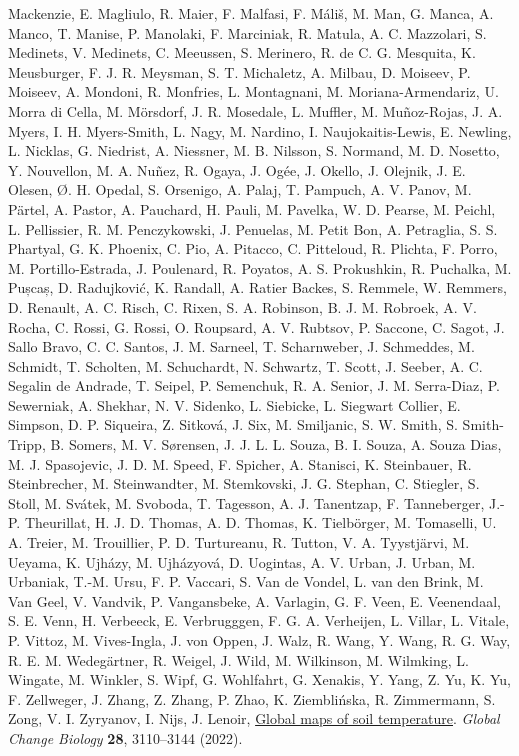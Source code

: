 \documentclass[
  letterpaper,
]{article}
\newlength{\cslhangindent}
\newenvironment{CSLReferences}[2] %
 {\begin{list}{}{%
  \setlength{\itemindent}{0pt}
  \setlength{\leftmargin}{0pt}
  \setlength{\parsep}{0pt}
  \ifodd #1
   \setlength{\leftmargin}{\cslhangindent}
   \setlength{\itemindent}{-1\cslhangindent}
  \fi
  \setlength{\itemsep}{#2\baselineskip}}}
 {\end{list}}
\begin{document}
\begin{CSLReferences}{0}{1}
{Mackenzie, E. Magliulo, R. Maier, F. Malfasi, F. Máliš, M. Man, G.
Manca, A. Manco, T. Manise, P. Manolaki, F. Marciniak, R. Matula, A. C.
Mazzolari, S. Medinets, V. Medinets, C. Meeussen, S. Merinero, R. de C.
G. Mesquita, K. Meusburger, F. J. R. Meysman, S. T. Michaletz, A.
Milbau, D. Moiseev, P. Moiseev, A. Mondoni, R. Monfries, L. Montagnani,
M. Moriana-Armendariz, U. Morra di Cella, M. Mörsdorf, J. R. Mosedale,
L. Muffler, M. Muñoz-Rojas, J. A. Myers, I. H. Myers-Smith, L. Nagy, M.
Nardino, I. Naujokaitis-Lewis, E. Newling, L. Nicklas, G. Niedrist, A.
Niessner, M. B. Nilsson, S. Normand, M. D. Nosetto, Y. Nouvellon, M. A.
Nuñez, R. Ogaya, J. Ogée, J. Okello, J. Olejnik, J. E. Olesen, Ø. H.
Opedal, S. Orsenigo, A. Palaj, T. Pampuch, A. V. Panov, M. Pärtel, A.
Pastor, A. Pauchard, H. Pauli, M. Pavelka, W. D. Pearse, M. Peichl, L.
Pellissier, R. M. Penczykowski, J. Penuelas, M. Petit Bon, A. Petraglia,
S. S. Phartyal, G. K. Phoenix, C. Pio, A. Pitacco, C. Pitteloud, R.
Plichta, F. Porro, M. Portillo-Estrada, J. Poulenard, R. Poyatos, A. S.
Prokushkin, R. Puchalka, M. Pușcaș, D. Radujković, K. Randall, A. Ratier
Backes, S. Remmele, W. Remmers, D. Renault, A. C. Risch, C. Rixen, S. A.
Robinson, B. J. M. Robroek, A. V. Rocha, C. Rossi, G. Rossi, O.
Roupsard, A. V. Rubtsov, P. Saccone, C. Sagot, J. Sallo Bravo, C. C.
Santos, J. M. Sarneel, T. Scharnweber, J. Schmeddes, M. Schmidt, T.
Scholten, M. Schuchardt, N. Schwartz, T. Scott, J. Seeber, A. C. Segalin
de Andrade, T. Seipel, P. Semenchuk, R. A. Senior, J. M. Serra-Diaz, P.
Sewerniak, A. Shekhar, N. V. Sidenko, L. Siebicke, L. Siegwart Collier,
E. Simpson, D. P. Siqueira, Z. Sitková, J. Six, M. Smiljanic, S. W.
Smith, S. Smith-Tripp, B. Somers, M. V. Sørensen, J. J. L. L. Souza, B.
I. Souza, A. Souza Dias, M. J. Spasojevic, J. D. M. Speed, F. Spicher,
A. Stanisci, K. Steinbauer, R. Steinbrecher, M. Steinwandter, M.
Stemkovski, J. G. Stephan, C. Stiegler, S. Stoll, M. Svátek, M. Svoboda,
T. Tagesson, A. J. Tanentzap, F. Tanneberger, J.-P. Theurillat, H. J. D.
Thomas, A. D. Thomas, K. Tielbörger, M. Tomaselli, U. A. Treier, M.
Trouillier, P. D. Turtureanu, R. Tutton, V. A. Tyystjärvi, M. Ueyama, K.
Ujházy, M. Ujházyová, D. Uogintas, A. V. Urban, J. Urban, M. Urbaniak,
T.-M. Ursu, F. P. Vaccari, S. Van de Vondel, L. van den Brink, M. Van
Geel, V. Vandvik, P. Vangansbeke, A. Varlagin, G. F. Veen, E.
Veenendaal, S. E. Venn, H. Verbeeck, E. Verbrugggen, F. G. A. Verheijen,
L. Villar, L. Vitale, P. Vittoz, M. Vives-Ingla, J. von Oppen, J. Walz,
R. Wang, Y. Wang, R. G. Way, R. E. M. Wedegärtner, R. Weigel, J. Wild,
M. Wilkinson, M. Wilmking, L. Wingate, M. Winkler, S. Wipf, G.
Wohlfahrt, G. Xenakis, Y. Yang, Z. Yu, K. Yu, F. Zellweger, J. Zhang, Z.
Zhang, P. Zhao, K. Ziemblińska, R. Zimmermann, S. Zong, V. I. Zyryanov,
I. Nijs, J. Lenoir, \href{https://doi.org/10.1111/gcb.16060}{Global maps
of soil temperature}. \emph{Global Change Biology} \textbf{28},
3110--3144 (2022).}


\end{CSLReferences}
\end{document}
